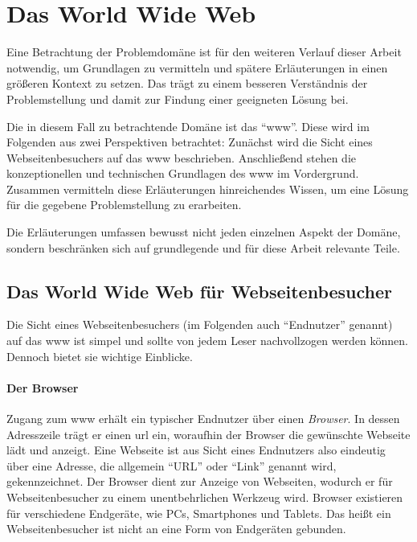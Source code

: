 \section{Das World Wide Web}
    \label{section:TheWWW}
    Eine Betrachtung der Problemdomäne ist für den weiteren
    Verlauf dieser Arbeit notwendig,
    um Grundlagen zu vermitteln und spätere Erläuterungen
    in einen größeren Kontext zu setzen.
    Das trägt zu einem besseren Verständnis der Problemstellung
    und damit zur Findung einer geeigneten Lösung bei.
    

    Die in diesem Fall zu betrachtende Domäne ist das "`\gls{www}"'.
    Diese wird im Folgenden aus zwei Perspektiven betrachtet:
    Zunächst wird die Sicht eines Webseitenbesuchers auf das \gls{www} beschrieben.
    Anschließend stehen die konzeptionellen und technischen Grundlagen
    des \gls{www} im Vordergrund.
    Zusammen vermitteln diese Erläuterungen hinreichendes Wissen,
    um eine Lösung für die gegebene Problemstellung zu erarbeiten.

    Die Erläuterungen umfassen bewusst nicht jeden einzelnen Aspekt der Domäne,
    sondern beschränken sich auf grundlegende und für diese Arbeit relevante Teile.

    \subsection{Das World Wide Web für Webseitenbesucher}
        \label{section:enduserViewOnWWW}
        Die Sicht eines Webseitenbesuchers (im Folgenden auch "`Endnutzer"' genannt)
        auf das \gls{www} ist simpel und sollte von jedem Leser nachvollzogen werden können.
        Dennoch bietet sie wichtige Einblicke.

        \paragraph*{Der Browser}
        Zugang zum \gls{www} erhält ein typischer Endnutzer über einen \textit{Browser}.
        In dessen Adresszeile trägt er einen \gls{url} ein,
        woraufhin der Browser die gewünschte Webseite lädt und anzeigt.
        Eine Webseite ist aus Sicht eines Endnutzers also eindeutig über eine
        Adresse, die allgemein "`URL"' oder "`Link"' genannt wird, gekennzeichnet.
        Der Browser dient zur Anzeige von Webseiten, wodurch er für Webseitenbesucher
        zu einem unentbehrlichen Werkzeug wird.
        Browser existieren für verschiedene Endgeräte,
        wie PCs, Smartphones und Tablets.
        Das heißt ein Webseitenbesucher ist nicht an eine Form von Endgeräten gebunden.

